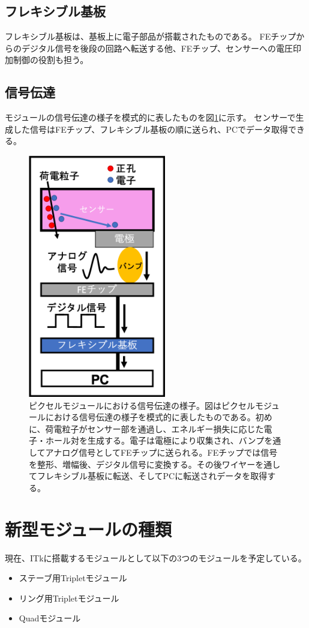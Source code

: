 \subsection{フレキシブル基板}
フレキシブル基板は、基板上に電子部品が搭載されたものである。
FEチップからのデジタル信号を後段の回路へ転送する他、FEチップ、センサーへの電圧印加制御の役割も担う。

\subsection{信号伝達}
モジュールの信号伝達の様子を模式的に表したものを図\ref{module_electric_overview}に示す。
センサーで生成した信号はFEチップ、フレキシブル基板の順に送られ、PCでデータ取得できる。

\begin{figure}[bpt]\centering
\includegraphics[width=6cm]{./module_electric_overview.png}
\caption[ピクセルモジュールにおける信号伝達の様子]{ピクセルモジュールにおける信号伝達の様子。図はピクセルモジュールにおける信号伝達の様子を模式的に表したものである。初めに、荷電粒子がセンサー部を通過し、エネルギー損失に応じた電子・ホール対を生成する。電子は電極により収集され、バンプを通してアナログ信号としてFEチップに送られる。FEチップでは信号を整形、増幅後、デジタル信号に変換する。その後ワイヤーを通してフレキシブル基板に転送、そしてPCに転送されデータを取得する。}
\label{module_electric_overview}
\end{figure}

\clearpage
\section{新型モジュールの種類}
現在、ITkに搭載するモジュールとして以下の3つのモジュールを予定している。
\begin{itemize}
  \item ステーブ用Tripletモジュール
  \item リング用Tripletモジュール
  \item Quadモジュール
\end{itemize}

